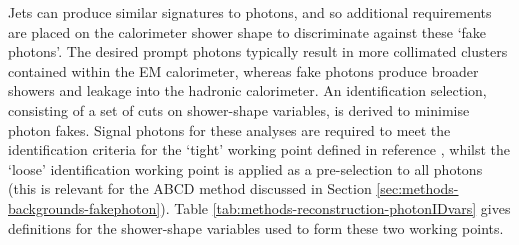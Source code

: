 Jets can produce similar signatures to photons, and so additional
requirements are placed on the calorimeter shower shape to discriminate against
these `fake photons'. The desired prompt photons typically result in more
collimated clusters contained within the \ac{EM} calorimeter, whereas fake
photons produce broader showers and leakage into the hadronic calorimeter.
An identification selection, consisting of a set of cuts on shower-shape
variables, is derived to minimise photon fakes. Signal photons for these analyses are
required to meet the identification criteria for the `tight' working point
defined in reference \cite{ATLASegamPerf2019}, whilst the `loose' identification
working point is applied as a pre-selection to all photons (this is relevant for
the ABCD method discussed in Section \ref{sec:methods-backgrounds-fakephoton}).
Table \ref{tab:methods-reconstruction-photonIDvars} gives definitions for the
shower-shape variables used to form these two working points.

